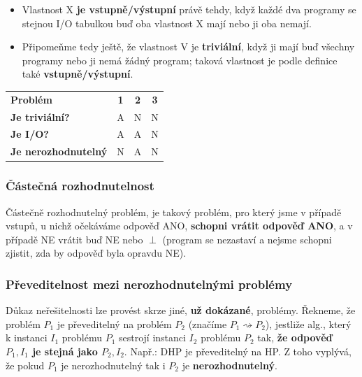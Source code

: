 \begin{itemize}
\item Vlastnost X \textbf{je vstupně/výstupní} právě tehdy, když každé dva programy se stejnou I/O tabulkou buď oba vlastnost X mají nebo ji oba nemají.
\item Připomeňme tedy ještě, že vlastnost V je \textbf{triviální}, když ji mají buď všechny programy nebo ji nemá žádný program; taková vlastnost je podle definice také \textbf{vstupně/výstupní}.
\end{itemize}

\begin{table}[H]
	\centering
	\begin{tabular}{l|c|c|c}
		\textbf{Problém}            & \textbf{1} & \textbf{2} & \textbf{3} \\\hhline
		\textbf{Je triviální?}      &     A       &      N      &      N      \\ 
		\textbf{Je I/O?}            &   A         &        A    &        N    \\
		\textbf{Je nerozhodnutelný} &         N   &       A     &           N
	\end{tabular}
\end{table}

\subsubsection{Částečná rozhodnutelnost}
Částečně rozhodnutelný problém, je takový problém, pro který jsme v případě vstupů, u nichž očekáváme odpověď ANO, \textbf{schopni vrátit odpověď ANO}, a v případě NE vrátit buď NE nebo $\perp$ (program se nezastaví a nejsme schopni zjistit, zda by odpověď byla opravdu NE).

\subsubsection{Převeditelnost mezi nerozhodnutelnými problémy}
Důkaz neřešitelnosti lze provést skrze jiné, \textbf{už dokázané}, problémy. Řekneme, že problém $P_1$ je převeditelný na problém $P_2$ (značíme $P_1 \rightsquigarrow P_2$), jestliže alg., který k instanci $I_1$ problému $P_1$ sestrojí instanci $I_2$ problému $P_2$ tak, \textbf{že odpověď $P_1, I_1$ je stejná jako $P_2, I_2$}. Např.: DHP je převeditelný na HP.  Z toho vyplývá, že pokud $P_1$ je nerozhodnutelný tak i $P_2$ je \textbf{nerozhodnutelný}.

